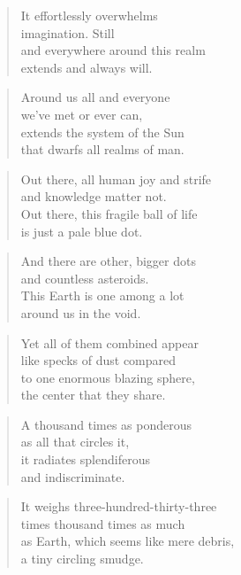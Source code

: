 \documentclass[10pt,a4paper]{article}
\begin{document}
\begin{multicols}{2}
\begin{verse}
It effortlessly overwhelms\\
imagination. Still\\
and everywhere around this realm\\
extends and always will.
\end{verse}

\begin{verse}
Around us all and everyone\\
we’ve met or ever can,\\
extends the system of the Sun\\
that dwarfs all realms of man.
\end{verse}

\begin{verse}
Out there, all human joy and strife\\
and knowledge matter not.\\
Out there, this fragile ball of life\\
is just a pale blue dot.
\end{verse}

\begin{verse}
And there are other, bigger dots\\
and countless asteroids.\\
This Earth is one among a lot\\
around us in the void.
\end{verse}

\begin{verse}
Yet all of them combined appear\\
like specks of dust compared\\
to one enormous blazing sphere,\\
the center that they share.
\end{verse}

\begin{verse}
A thousand times as ponderous\\
as all that circles it,\\
it radiates splendiferous\\
and indiscriminate. \\
\end{verse}

\begin{verse}
It weighs three-hundred-thirty-three\\
times thousand times as much\\
as Earth, which seems like mere debris,\\
a tiny circling smudge.
\end{verse}


\end{multicols}
\end{document}
